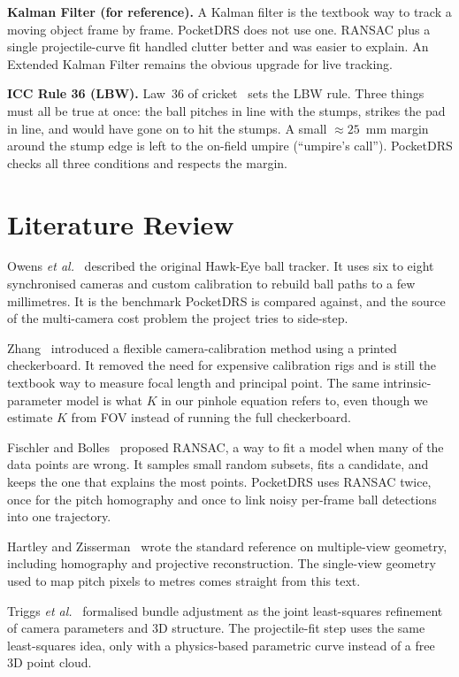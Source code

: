 \documentclass[12pt,a4paper]{report}
\begin{document}
\textbf{Kalman Filter (for reference).} A Kalman filter is the textbook way to track a moving object frame by frame. PocketDRS does not use one. RANSAC plus a single projectile-curve fit handled clutter better and was easier to explain. An Extended Kalman Filter remains the obvious upgrade for live tracking.

\textbf{ICC Rule 36 (LBW).} Law~36 of cricket~\cite{icc} sets the LBW rule. Three things must all be true at once: the ball pitches in line with the stumps, strikes the pad in line, and would have gone on to hit the stumps. A small $\approx 25$~mm margin around the stump edge is left to the on-field umpire (``umpire's call''). PocketDRS checks all three conditions and respects the margin.

\section{Literature Review}

Owens \textit{et al.}~\cite{owens2003} described the original Hawk-Eye ball tracker. It uses six to eight synchronised cameras and custom calibration to rebuild ball paths to a few millimetres. It is the benchmark PocketDRS is compared against, and the source of the multi-camera cost problem the project tries to side-step.

Zhang~\cite{zhang2000} introduced a flexible camera-calibration method using a printed checkerboard. It removed the need for expensive calibration rigs and is still the textbook way to measure focal length and principal point. The same intrinsic-parameter model is what $K$ in our pinhole equation refers to, even though we estimate $K$ from FOV instead of running the full checkerboard.

Fischler and Bolles~\cite{fischler1981} proposed RANSAC, a way to fit a model when many of the data points are wrong. It samples small random subsets, fits a candidate, and keeps the one that explains the most points. PocketDRS uses RANSAC twice, once for the pitch homography and once to link noisy per-frame ball detections into one trajectory.

Hartley and Zisserman~\cite{hartley2004} wrote the standard reference on multiple-view geometry, including homography and projective reconstruction. The single-view geometry used to map pitch pixels to metres comes straight from this text.

Triggs \textit{et al.}~\cite{triggs2000} formalised bundle adjustment as the joint least-squares refinement of camera parameters and 3D structure. The projectile-fit step uses the same least-squares idea, only with a physics-based parametric curve instead of a free 3D point cloud.
\end{document}
